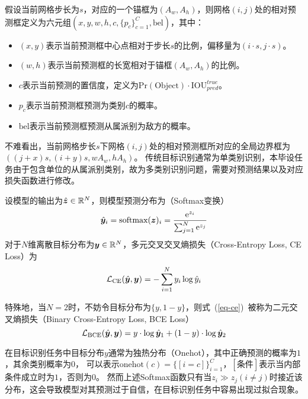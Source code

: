 假设当前网格步长为$s$，对应的一个锚框为$(A_w,A_h)$，则网格$(i,j)$处的相对预测框定义为六元组$(x,y,w,h,c,\{p_c\}_{c=1}^C, \text{bel})$，其中：
\begin{itemize}
  \item $(x,y)$表示当前预测框中心点相对于步长$s$的比例，偏移量为$(i\cdot s, j\cdot s)$。
  \item $(w,h)$表示当前预测框的长宽相对于锚框$(A_w,A_h)$的比例。
  \item $c$表示当前预测的置信度，定义为$\text{Pr}(\text{Object})\cdot \text{IOU}_{pred}^{true}$。
  \item $p_c$表示当前预测框预测为类别$c$的概率。
  \item $\text{bel}$表示当前预测框预测从属派别为敌方的概率。
\end{itemize}
不难看出，当前网格步长$s$下网格$(i,j)$处的相对预测框所对应的全局边界框为$((j+x)s,(i+y)s, wA_w, hA_h)$。
传统目标识别通常为单类别识别，本毕设任务由于包含单位的从属派别类别，故为多类别识别问题，需要对预测结果以及对应损失函数进行修改。

设模型的输出为$\hat{\boldsymbol{z}}\in\mathbb{R}^{N}$，则模型预测分布为（Softmax变换）
\begin{equation}
  \hat{\boldsymbol{y}}_i = \text{softmax}(\boldsymbol{z})_i = \frac{\mathrm{e}^{z_i}}{\sum_{j=1}^N\mathrm{e}^{z_j}}
\end{equation}
对于$N$维离散目标分布为$\boldsymbol{y}\in\mathbb{R}^N$，多元交叉交叉熵损失（Cross-Entropy Loss, CE Loss）为
\begin{equation}\label{eq-ce}
  \mathcal{L}_{\text{CE}}(\hat{\boldsymbol{y}},\boldsymbol{y}) = -\sum_{i=1}^Ny_i\log\hat{y}_{i}
\end{equation}

特殊地，当$N=2$时，不妨令目标分布为$\{y, 1-y\}$，则式~(\ref{eq-ce})~被称为二元交叉熵损失（Binary Cross-Entropy Loss, BCE Loss）
\begin{equation}
  \mathcal{L}_{\text{BCE}}(\hat{\boldsymbol{y}},\boldsymbol{y}) = y\cdot \log\hat{\boldsymbol{y}}_{1} + (1-y)\cdot \log\hat{\boldsymbol{y}}_2
\end{equation}

在目标识别任务中目标分布$y$通常为独热分布（Onehot），其中正确预测的概率为$1$，其余类别概率为$0$，
可以表示$\text{onehot}(c) = \{[i=c]\}_{i=1}^C$，$[\text{条件}]$表示当内部条件成立时为$1$，否则为$0$。
然而上述Softmax函数只有当$z_i\gg z_j(i\neq j)$时接近该分布，这会导致模型对其预测过于自信，在目标识别任务中容易出现过拟合现象。

